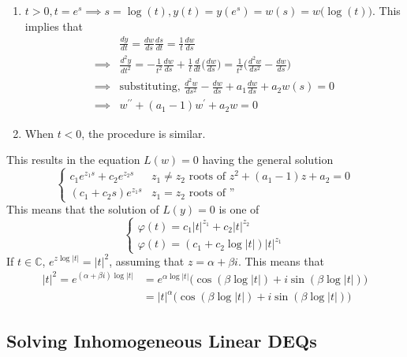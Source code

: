 \documentclass{article}
\theoremstyle{remark}
\theoremstyle{definition}
\begin{document}
      \begin{enumerate}
          \item $t > 0, t = e^s \implies s = \log(t), y(t) = y(e^s) = w(s) = w \big( \log(t)\big)$. This implies that
          \begin{align*}
              & \frac{d y}{d t} = \frac{dw}{ds} \frac{ds}{dt} = \frac{1}{t} \frac{dw}{ds} \\
              \implies & \frac{d^2 y}{dt^2} = -\frac{1}{t^2} \frac{dw}{ds} + \frac{1}{t} \frac{d}{dt} \bigg( \frac{dw}{ds}\bigg) = \frac{1}{t^2} \bigg( \frac{d^2 w}{ds^2} - \frac{dw}{ds} \bigg) \\
              \implies & \text{substituting, } \frac{d^2 w}{ds^2} - \frac{dw}{ds} + a_1 \frac{dw}{ds} + a_2 w(s) = 0 \\
              \implies & w^{\prime\prime} + (a_1 - 1) w^\prime + a_2 w = 0
          \end{align*}
          \item When $t<0$, the procedure is similar. 
      \end{enumerate}
      This results in the equation $L(w) =0$ having the general solution 
      \[\begin{cases}
      c_1 e^{z_1 s} + c_2 e^{z_2 s} & z_1 \neq z_2 \text{ roots of } z^2 + (a_1 - 1) z + a_2 = 0 \\
      (c_1 + c_2 s) e^{z_1 s} & z_1 = z_2 \text{ roots of ''}
      \end{cases}\]
      This means that the solution of $L(y) = 0$ is one of
      \[\begin{cases}
      \varphi(t) = c_1 |t|^{z_1} + c_2 |t|^{z_2} \\
      \varphi(t) = (c_1 + c_2 \log|t|) |t|^{z_1}
      \end{cases}\]
      If $t \in \mathbb{C}$, $e^{z \log|t|} = |t|^2$, assuming that $z = \alpha + \beta i$. This means that 
      \begin{align*}
          |t|^2 = e^{(\alpha + \beta i) \log|t|} & = e^{\alpha \log|t|} \big( \cos{(\beta \log|t|)} + i \sin{(\beta \log|t|)}\big) \\
          & = |t|^\alpha \big( \cos{(\beta \log|t|)} + i \sin{(\beta \log|t|)}\big)
      \end{align*}

  \subsection{Solving Inhomogeneous Linear DEQs}
\end{document}
